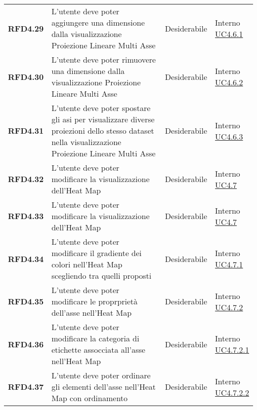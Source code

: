 \begin{longtable}[H]{>{\raggedright\bfseries}m{20mm} >{\raggedright}m{90mm} >{\raggedright}m{28mm} >{\raggedright\arraybackslash}m{30mm}}
    RFD4.29
    & L'utente deve poter aggiungere una dimensione dalla visualizzazione Proiezione Lineare Multi Asse
    & Desiderabile
    & \makecell{ Interno \\  \hyperref[par:uc4.6.1]{UC4.6.1} }\\

    RFD4.30
    & L'utente deve poter rimuovere una dimensione dalla visualizzazione Proiezione Lineare Multi Asse
    & Desiderabile
    & \makecell{ Interno \\  \hyperref[par:uc4.6.2]{UC4.6.2} }\\

    RFD4.31
    & L'utente deve poter spostare gli asi per visualizzare diverse proiezioni dello stesso dataset nella visualizzazione Proiezione Lineare Multi Asse
    & Desiderabile
    & \makecell{ Interno \\  \hyperref[par:uc4.6.3]{UC4.6.3} }\\

    RFD4.32
    & L'utente deve poter modificare la visualizzazione dell'Heat Map
    & Desiderabile
    & \makecell{ Interno \\  \hyperref[ssub:uc4.7]{UC4.7} }\\

    RFD4.33
    & L'utente deve poter modificare la visualizzazione dell'Heat Map
    & Desiderabile
    & \makecell{ Interno \\  \hyperref[ssub:uc4.7]{UC4.7} }\\

    RFD4.34
    & L'utente deve poter modificare il gradiente dei colori nell'Heat Map scegliendo tra quelli proposti
    & Desiderabile
    & \makecell{ Interno \\  \hyperref[par:uc4.7.1]{UC4.7.1} }\\

    RFD4.35
    & L'utente deve poter modificare le proprprietà dell'asse nell'Heat Map
    & Desiderabile
    & \makecell{ Interno \\  \hyperref[par:uc4.7.2]{UC4.7.2} }\\

    RFD4.36
    & L'utente deve poter modificare la categoria di etichette assocciata all'asse nell'Heat Map
    & Desiderabile
    & \makecell{ Interno \\  \hyperref[spar:uc4.7.2.1]{UC4.7.2.1} }\\

    RFD4.37
    & L'utente deve poter ordinare gli elementi dell'asse nell'Heat Map con ordinamento
    & Desiderabile
    & \makecell{ Interno \\  \hyperref[spar:uc4.7.2.2]{UC4.7.2.2} }\\


\end{longtable}
